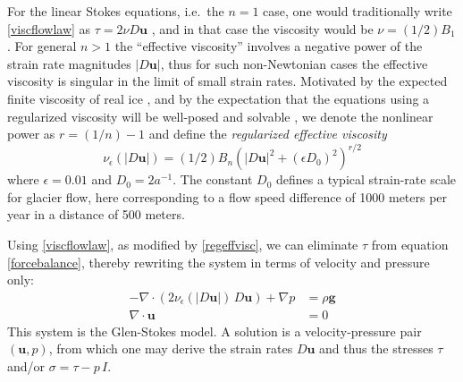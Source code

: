 \documentclass[letterpaper,final,12pt,reqno]{amsart}
\newcommand{\eps}{\epsilon}
\newcommand{\Div}{\nabla\cdot}
\newcommand{\bu}{\mathbf{u}}
\begin{document}
For the linear Stokes equations, i.e.~the $n=1$ case, one would traditionally write \eqref{viscflowlaw} as $\tau = 2\nu D\bu$ \cite{Elmanetal2014}, and in that case the viscosity would be $\nu = (1/2) B_1$.  For general $n>1$ the ``effective viscosity'' involves a negative power of the strain rate magnitudes $|D\bu|$, thus for such non-Newtonian cases the effective viscosity is singular in the limit of small strain rates.  Motivated by the expected finite viscosity of real ice \cite{GreveBlatter2009}, and by the expectation that the equations using a regularized viscosity will be well-posed and solvable \cite{JouvetRappaz2011}, we denote the nonlinear power as $r=(1/n)-1$ and define the \emph{regularized effective viscosity}
\begin{equation}
\nu_\eps(|D\bu|) = (1/2) B_n \left(|D\bu|^2 + (\eps D_0)^2\right)^{r/2} \label{regeffvisc}
\end{equation}
where $\eps = 0.01$ and $D_0 = 2 a^{-1}$.  The constant $D_0$ defines a typical strain-rate scale for glacier flow, here corresponding to a flow speed difference of 1000 meters per year in a distance of 500 meters.

Using \eqref{viscflowlaw}, as modified by \eqref{regeffvisc}, we can eliminate $\tau$ from equation \eqref{forcebalance}, thereby rewriting the system in terms of velocity and pressure only:
\begin{align}
- \nabla \cdot \left(2 \nu_\eps(|D\bu|)\, D\bu\right) + \nabla p &= \rho \mathbf{g} \label{stokes} \\
\Div \bu &= 0 \label{incompagain}
\end{align}
This system is the Glen-Stokes model.  A solution is a velocity-pressure pair $(\bu,p)$, from which one may derive the strain rates $D\bu$ and thus the stresses $\tau$ and/or $\sigma = \tau - p\,I$.
\end{document}
